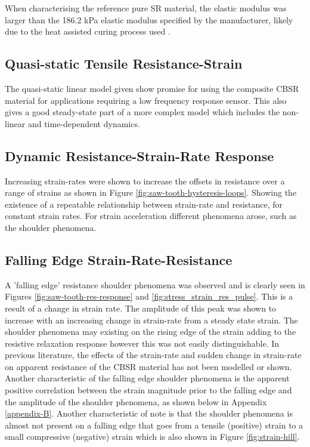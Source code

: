 When characterising the reference pure SR material, the elastic modulus was larger than the 186.2 kPa elastic modulus specified by the manufacturer, likely due to the heat assisted curing process used \cite{Johnston2014}.


\subsection{Quasi-static Tensile Resistance-Strain}
The quasi-static linear model given show promise for using the composite CBSR material for applications requiring a low frequency response sensor. This also gives a good steady-state part of a more complex model which includes the non-linear and time-dependent dynamics.


\subsection{Dynamic Resistance-Strain-Rate Response}
Increasing strain-rates were shown to increase the offsets in resistance over a range of strains as shown in Figure \ref{fig:saw-tooth-hysteresis-loops}. Showing the existence of a repeatable relationship between strain-rate and resistance, for constant strain rates. For strain acceleration different phenomena arose, such as the shoulder phenomena.


\subsection{Falling Edge Strain-Rate-Resistance}
A 'falling edge' resistance shoulder phenomena was observed and is clearly seen in Figures \ref{fig:saw-tooth-res-response} and \ref{fig:stress_strain_res_pulse}. This is a result of a change in strain rate. The amplitude of this peak was shown to increase with an increasing change in strain-rate from a steady state strain. The shoulder phenomena may existing on the rising edge of the strain adding to the resistive relaxation response however this was not easily distinguishable. In previous literature, the effects of the strain-rate and sudden change in strain-rate on apparent resistance of the CBSR material has not been modelled or shown. Another characteristic of the falling edge shoulder phenomena is the apparent positive correlation between the strain magnitude prior to the falling edge and the amplitude of the shoulder phenomena, as shown below in Appendix \ref{appendix-B}. Another characteristic of note is that the shoulder phenomena is almost not present on a falling edge that goes from a tensile (positive) strain to a small compressive (negative) strain which is also shown in Figure \ref{fig:strain-hill}.


